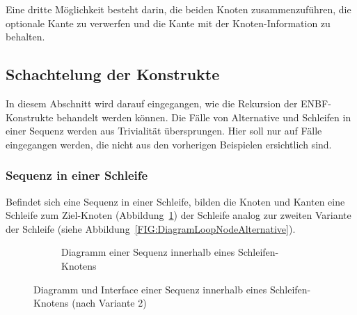 \documentclass[../InterneDSLs.tex]{subfiles}
\begin{document}
Eine dritte Möglichkeit besteht darin, die beiden Knoten zusammenzuführen, die optionale Kante zu verwerfen und die Kante mit der Knoten-Information zu behalten.

\subsection{Schachtelung der Konstrukte}
In diesem Abschnitt wird darauf eingegangen, wie die Rekursion der ENBF-Konstrukte behandelt werden können. Die Fälle von Alternative und Schleifen in einer Sequenz werden aus Trivialität übersprungen. Hier soll nur auf Fälle eingegangen werden, die nicht aus den vorherigen Beispielen ersichtlich sind.

\subsubsection{Sequenz in einer Schleife}
Befindet sich eine Sequenz in einer Schleife, bilden die Knoten und Kanten eine Schleife zum Ziel-Knoten (Abbildung~\ref{FIG:DiagramSequenceInLoop}) der Schleife analog zur zweiten Variante der Schleife (siehe Abbildung~\ref{FIG:DiagramLoopNodeAlternative}).
\begin{figure}[ht]
\centering
  \begin{subfigure}[c]{0.49\textwidth}
    \caption{Diagramm einer Sequenz innerhalb eines Schleifen-Knotens}
    \label{FIG:DiagramSequenceInLoop}
  \end{subfigure}
  \begin{subfigure}[c]{0.49\textwidth}
    
  \end{subfigure}
  \caption{Diagramm und Interface einer Sequenz innerhalb eines Schleifen-Knotens (nach Variante 2)}
  \label{FIG:SequenceInLoop}
\end{figure}
\end{document}
